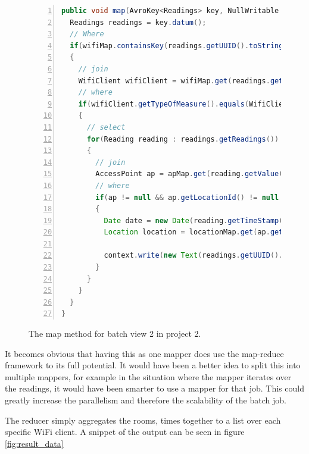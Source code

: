 \begin{figure}[H]
	
\begin{lstlisting}[frame=single, backgroundcolor=\color{light-gray}, basicstyle=\footnotesize\ttfamily, language=Java, numbers=left, numberstyle=\tiny \color{black}, breaklines=true]
public void map(AvroKey<Readings> key, NullWritable value, Context context) throws IOException, InterruptedException {
  Readings readings = key.datum();
  // Where
  if(wifiMap.containsKey(readings.getUUID().toString()))
  {
	// join
    WifiClient wifiClient = wifiMap.get(readings.getUUID().toString());
    // where
    if(wifiClient.getTypeOfMeasure().equals(WifiClientMeasure.AccessPoint))
    {
	  // select
      for(Reading reading : readings.getReadings())
      {
	    // join
        AccessPoint ap = apMap.get(reading.getValue());
        // where
        if(ap != null && ap.getLocationId() != null && locationMap.containsKey(ap.getLocationId()))
        {
          Date date = new Date(reading.getTimeStamp());
          Location location = locationMap.get(ap.getLocationId());
           
          context.write(new Text(readings.getUUID().toString()), new Text(location.getRoom() + "-" + dateFormat.format(date)));
        }
      }
    }
  }
}
\end{lstlisting}
\label{code:project2_mapper}
\caption{The map method for batch view 2 in project 2.}
\end{figure}

It becomes obvious that having this as one mapper does use the map-reduce framework to its full potential. It would have been a better idea to split this into multiple mappers, for example in the situation where the mapper iterates over the readings, it would have been smarter to use a mapper for that job. This could greatly increase the parallelism and therefore the scalability of the batch job.

The reducer simply aggregates the rooms, times together to a list over each specific WiFi client. A snippet of the output can be seen in figure \ref{fig:result_data}

